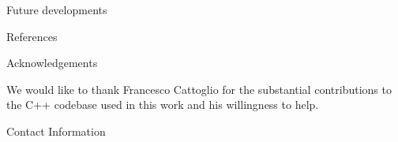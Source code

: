 \documentclass[final]{beamer}
\newlength{\onecolwid}
\begin{document}
\begin{frame}[t]
\begin{columns}[t]
\begin{column}{\onecolwid}
\begin{block}{Future developments}
\end{block}


\begin{block}{References}

\nocite{*} %
\footnotesize{
\vspace{0.75in}}

\end{block}



\begin{block}{Acknowledgements}

We would like to thank Francesco Cattoglio for the substantial
contributions to the C++ codebase used in this work and his willingness to help.

\end{block}



\begin{alertblock}{Contact Information}


\end{alertblock}
\end{column}
\end{columns}
\end{frame}
\end{document}
